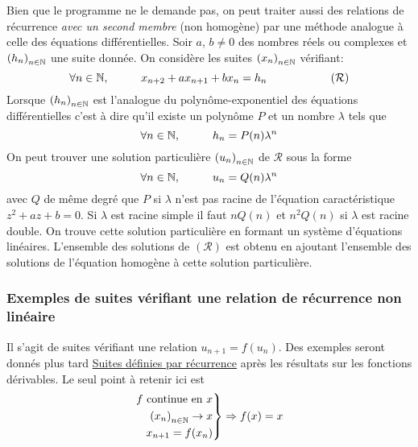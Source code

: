 Bien que le programme ne le demande pas, on peut traiter aussi des relations de récurrence \emph{avec un second membre} (non homogène) par une méthode analogue à celle des équations différentielles.\newline
Soir $a$, $b\neq 0$ des nombres réels ou complexes et $\left( h_n\right)_{n\in \mathbb{N}}$ une suite donnée. On considère les suites $\left( x_n\right)_{n\in \mathbb{N}}$ vérifiant:
\begin{displaymath}
  \forall n \in \mathbb{N},\hspace{1cm} x_{n+2} + ax_{n+1} + bx_n = h_n \hspace{2cm} (\mathcal{R})
\end{displaymath}
Lorsque $\left( h_n\right)_{n\in \mathbb{N}}$ est l'analogue du polynôme-exponentiel des équations différentielles c'est à dire qu'il existe un polynôme $P$ et un nombre $\lambda$ tels que
\begin{displaymath}
  \forall n\in \mathbb{N},\hspace{1cm} h_n = P(n) \lambda^n
\end{displaymath}
On peut trouver une solution particulière $\left( u_n\right)_{n\in \mathbb{N}}$ de $\mathcal{R}$ sous la forme
\begin{displaymath}
  \forall n\in \mathbb{N},\hspace{1cm} u_n = Q(n) \lambda^n
\end{displaymath}
avec $Q$ de même degré que $P$ si $\lambda$ n'est pas racine de l'équation caractéristique $z^2+az+b=0$. Si $\lambda$ est racine simple il faut $nQ(n)$ et $n^2Q(n)$ si $\lambda$ est racine double. On trouve cette solution particulière en formant un système d'équations linéaires. L'ensemble des solutions de $(\mathcal{R})$ est obtenu en ajoutant l'ensemble des solutions de l'équation homogène à cette solution particulière.

\subsubsection{Exemples de suites vérifiant une relation de récurrence non linéaire}
Il s'agit de suites vérifiant une relation $u_{n+1} = f(u_n)$. Des exemples seront donnés plus tard \href{\baseurl C4792.pdf}{Suites définies par récurrence} après les résultats sur les fonctions dérivables. Le seul point à retenir ici est
\begin{displaymath}
\left. 
\begin{aligned}
  f \text{ continue en }x\\
  \left( x_n\right)_{n\in \mathbb{N}}\rightarrow x \\
  x_{n+1} = f(x_n)
\end{aligned}
\right\rbrace 
\Rightarrow f(x) = x
\end{displaymath}


